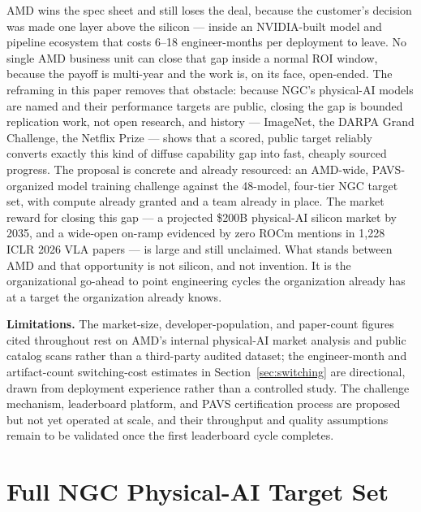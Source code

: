 \documentclass[blind]{gtac}
\begin{document}
AMD wins the spec sheet and still loses the deal, because the customer's decision was made one layer above the silicon --- inside an NVIDIA-built model and pipeline ecosystem that costs 6--18 engineer-months per deployment to leave. No single AMD business unit can close that gap inside a normal ROI window, because the payoff is multi-year and the work is, on its face, open-ended. The reframing in this paper removes that obstacle: because NGC's physical-AI models are named and their performance targets are public, closing the gap is bounded replication work, not open research, and history --- ImageNet, the DARPA Grand Challenge, the Netflix Prize --- shows that a scored, public target reliably converts exactly this kind of diffuse capability gap into fast, cheaply sourced progress. The proposal is concrete and already resourced: an AMD-wide, PAVS-organized model training challenge against the 48-model, four-tier NGC target set, with compute already granted and a team already in place. The market reward for closing this gap --- a projected \$200B physical-AI silicon market by 2035, and a wide-open on-ramp evidenced by zero ROCm mentions in 1{,}228 ICLR 2026 VLA papers --- is large and still unclaimed. What stands between AMD and that opportunity is not silicon, and not invention. It is the organizational go-ahead to point engineering cycles the organization already has at a target the organization already knows.

\textbf{Limitations.} The market-size, developer-population, and paper-count figures cited throughout rest on AMD's internal physical-AI market analysis and public catalog scans rather than a third-party audited dataset; the engineer-month and artifact-count switching-cost estimates in Section~\ref{sec:switching} are directional, drawn from deployment experience rather than a controlled study. The challenge mechanism, leaderboard platform, and PAVS certification process are proposed but not yet operated at scale, and their throughput and quality assumptions remain to be validated once the first leaderboard cycle completes.

\appendix
\section{Full NGC Physical-AI Target Set}
\label{app:tables}
\end{document}
